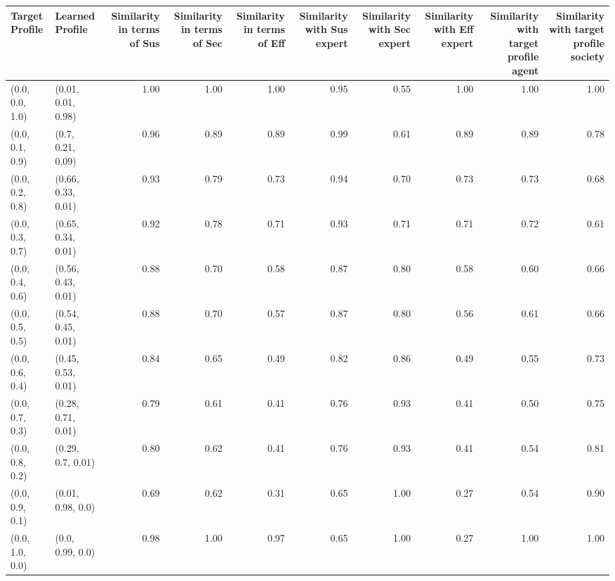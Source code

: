 \begin{tabular}{llrrrrrrrr}
\toprule
Target Profile & Learned Profile & Similarity in terms of Sus & Similarity in terms of Sec & Similarity in terms of Eff & Similarity with Sus expert & Similarity with Sec expert & Similarity with Eff expert & Similarity with target profile agent & Similarity with target profile society \\
\midrule
(0.0, 0.0, 1.0) & (0.01, 0.01, 0.98) & 1.00 & 1.00 & 1.00 & 0.95 & 0.55 & 1.00 & 1.00 & 1.00 \\
(0.0, 0.1, 0.9) & (0.7, 0.21, 0.09) & 0.96 & 0.89 & 0.89 & 0.99 & 0.61 & 0.89 & 0.89 & 0.78 \\
(0.0, 0.2, 0.8) & (0.66, 0.33, 0.01) & 0.93 & 0.79 & 0.73 & 0.94 & 0.70 & 0.73 & 0.73 & 0.68 \\
(0.0, 0.3, 0.7) & (0.65, 0.34, 0.01) & 0.92 & 0.78 & 0.71 & 0.93 & 0.71 & 0.71 & 0.72 & 0.61 \\
(0.0, 0.4, 0.6) & (0.56, 0.43, 0.01) & 0.88 & 0.70 & 0.58 & 0.87 & 0.80 & 0.58 & 0.60 & 0.66 \\
(0.0, 0.5, 0.5) & (0.54, 0.45, 0.01) & 0.88 & 0.70 & 0.57 & 0.87 & 0.80 & 0.56 & 0.61 & 0.66 \\
(0.0, 0.6, 0.4) & (0.45, 0.53, 0.01) & 0.84 & 0.65 & 0.49 & 0.82 & 0.86 & 0.49 & 0.55 & 0.73 \\
(0.0, 0.7, 0.3) & (0.28, 0.71, 0.01) & 0.79 & 0.61 & 0.41 & 0.76 & 0.93 & 0.41 & 0.50 & 0.75 \\
(0.0, 0.8, 0.2) & (0.29, 0.7, 0.01) & 0.80 & 0.62 & 0.41 & 0.76 & 0.93 & 0.41 & 0.54 & 0.81 \\
(0.0, 0.9, 0.1) & (0.01, 0.98, 0.0) & 0.69 & 0.62 & 0.31 & 0.65 & 1.00 & 0.27 & 0.54 & 0.90 \\
(0.0, 1.0, 0.0) & (0.0, 0.99, 0.0) & 0.98 & 1.00 & 0.97 & 0.65 & 1.00 & 0.27 & 1.00 & 1.00 \\
\bottomrule
\end{tabular}
